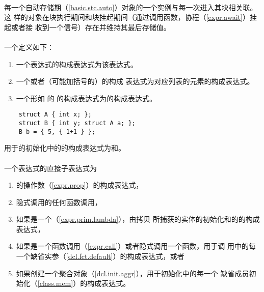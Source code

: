 \paragraph{} %
每一个自动存储期（\ref{basic.stc.auto}）对象的一个实例与每一次进入其块相关联。这
样的对象在块执行期间和块挂起期间（通过调用函数，协程（\ref{expr.await}）挂起或者接
收到一个信号）存在并维持其最后存储值。

\paragraph{} %
一个定义如下：
\begin{enumerate}
  \item 一个表达式的构成表达式为该表达式。
  \item 一个或者（可能加括号的）的构成
        表达式为对应列表的元素的构成表达式。
  \item 一个形如\tm{=} 的
        的构成表达式为的构成表达式。
\end{enumerate}

\begin{example}
  \begin{lstlisting}
    struct A { int x; };
    struct B { int y; struct A a; };
    B b = { 5, { 1+1 } };
  \end{lstlisting}
  用于的初始化中的的构成表达式为和。
\end{example}

\paragraph{} %
一个表达式的直接子表达式为
\begin{enumerate}
  \item {}的操作数（\ref{expr.prop}）的构成表达式，
  \item {}隐式调用的任何函数调用，
  \item 如果是一个（\ref{expr.prim.lambda}），由拷贝
        所捕获的实体的初始化和的的构成表达式，
  \item 如果是一个函数调用（\ref{expr.call}）或者隐式调用一个函数，用于调
        用中的每一个缺省实参（\ref{dcl.fct.default}）的构成表达式，或者
  \item 如果创建一个聚合对象（\ref{dcl.init.aggr}），用于初始化中的每一个
        缺省成员初始化（\ref{class.mem}）的构成表达式。
\end{enumerate}

